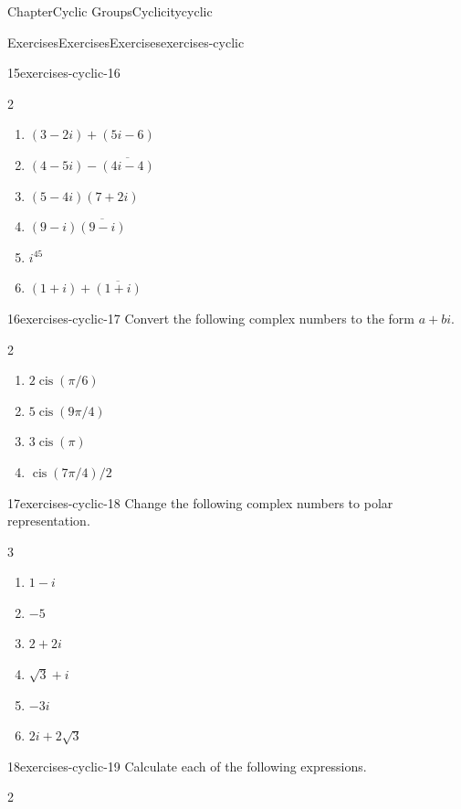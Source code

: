 \documentclass[oneside,10pt,]{book}
\numberwithin{equation}{section}
\newcommand{\cis}{\operatorname{cis}}
\begin{document}
\begin{chapterptx}{Chapter}{Cyclic Groups}{}{Cyclicity}{}{}{cyclic}
\begin{exercises-section}{Exercises}{Exercises}{}{Exercises}{}{}{exercises-cyclic}
\begin{divisionexercise}{15}{}{}{exercises-cyclic-16}
\begin{multicols}{2}
\begin{enumerate}[label={(\alph*)}]
\item{}\(\displaystyle (3-2i)+ (5i-6)\)%
\item{}\(\displaystyle (4-5i)-\overline{(4i -4)}\)%
\item{}\(\displaystyle (5-4i)(7+2i)\)%
\item{}\(\displaystyle (9-i) \overline{(9-i)}\)%
\item{}\(\displaystyle i^{45}\)%
\item{}\(\displaystyle (1+i)+\overline{(1+i)}\)%
\end{enumerate}
\end{multicols}
\end{divisionexercise}%
\begin{divisionexercise}{16}{}{}{exercises-cyclic-17}%
Convert the following complex numbers to the form \(a + bi\).%
%
\begin{multicols}{2}
\begin{enumerate}[label={(\alph*)}]
\item{}\(\displaystyle 2 \cis(\pi / 6 )\)%
\item{}\(\displaystyle 5 \cis(9\pi/4)\)%
\item{}\(\displaystyle 3 \cis(\pi)\)%
\item{}\(\displaystyle \cis(7\pi/4) /2\)%
\end{enumerate}
\end{multicols}
\end{divisionexercise}%
\begin{divisionexercise}{17}{}{}{exercises-cyclic-18}%
Change the following complex numbers to polar representation.%
%
\begin{multicols}{3}
\begin{enumerate}[label={(\alph*)}]
\item{}\(\displaystyle 1-i\)%
\item{}\(\displaystyle -5\)%
\item{}\(\displaystyle 2+2i\)%
\item{}\(\displaystyle \sqrt{3} + i\)%
\item{}\(\displaystyle -3i\)%
\item{}\(\displaystyle 2i + 2 \sqrt{3}\)%
\end{enumerate}
\end{multicols}
\end{divisionexercise}%
\begin{divisionexercise}{18}{}{}{exercises-cyclic-19}%
Calculate each of the following expressions.%
%
\begin{multicols}{2}
\begin{enumerate}[label={(\alph*)}]

\end{enumerate}
\end{multicols}
\end{divisionexercise}
\end{exercises-section}
\end{chapterptx}
\end{document}
